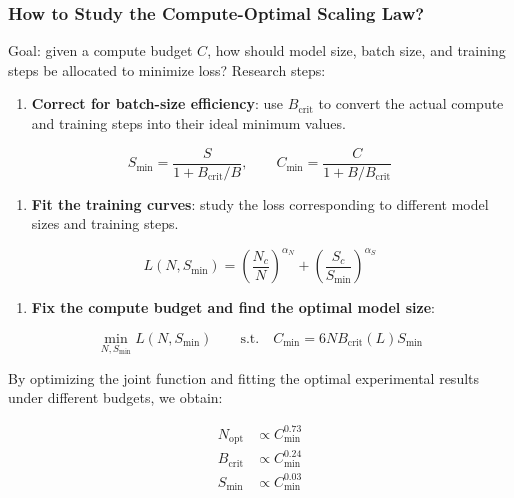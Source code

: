 \documentclass[
  english,
  11pt,
  a4paper,
]{article}
\providecommand{\tightlist}{%
  \setlength{\itemsep}{0pt}\setlength{\parskip}{0pt}}
\newenvironment{NotesFormula}{%
  \par\noindent\begin{minipage}{\linewidth}%
  \setlength{\parindent}{2em}%
  \setlength{\parskip}{0.35em}%
}{\end{minipage}\par}
\begin{document}
\subsubsection{How to Study the Compute-Optimal Scaling
Law?}\label{how-to-study-the-compute-optimal-scaling-law}

Goal: given a compute budget \(C\), how should model size, batch size,
and training steps be allocated to minimize loss? Research steps:

\begin{enumerate}
\def\labelenumi{\arabic{enumi}.}
\tightlist
\item
  \textbf{Correct for batch-size efficiency}: use \(B_{\mathrm{crit}}\)
  to convert the actual compute and training steps into their ideal
  minimum values.
\end{enumerate}

\[S_{\min}=\frac{S}{1+B_{\mathrm{crit}}/B},\qquad
C_{\min}=\frac{C}{1+B/B_{\mathrm{crit}}}\]

\begin{enumerate}
\def\labelenumi{\arabic{enumi}.}
\setcounter{enumi}{1}
\tightlist
\item
  \textbf{Fit the training curves}: study the loss corresponding to
  different model sizes and training steps.
\end{enumerate}

\[\boxed{L(N,S_{\min})=\left(\frac{N_c}{N}\right)^{\alpha_N}+\left(\frac{S_c}{S_{\min}}\right)^{\alpha_S}}\]

\begin{enumerate}
\def\labelenumi{\arabic{enumi}.}
\setcounter{enumi}{2}
\tightlist
\item
  \textbf{Fix the compute budget and find the optimal model size}:
\end{enumerate}

\[\min_{N,S_{\min}}L(N,S_{\min})\qquad
\text{s.t.}\quad C_{\min}=6NB_{\mathrm{crit}}(L)S_{\min}\]

\begin{NotesFormula}

By optimizing the joint function and fitting the optimal experimental
results under different budgets, we obtain:

\[\boxed{
\begin{aligned}
N_{\mathrm{opt}}&\propto C_{\min}^{0.73}\\
B_{\mathrm{crit}}&\propto C_{\min}^{0.24}\\
S_{\min}&\propto C_{\min}^{0.03}
\end{aligned}}\]

\end{NotesFormula}
\end{document}

